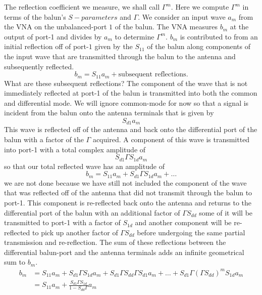 \documentclass[preprint]{aastex}
\begin{document}
The reflection coefficient we measure, we shall call $\Gamma^m$. Here we compute $\Gamma^m$ in terms of the balun's $S-parameters$ and $\Gamma$. We consider an input wave $a_m$ from the VNA on the unbalanced-port $1$ of the balun. The VNA measures $b_m$ at the output of port-1 and divides by $a_m$ to determine $\Gamma^m$. $b_m$ is contributed to from an initial reflection off of port-$1$ given by the $S_{11}$ of the balun along components of the input wave that are transmitted through the balun to the antenna and subsequently reflected.
\begin{equation}
b_m =  S_{11} a_m + \text{subsequent reflections}.
\end{equation}
What are these subsequent reflections? The component of the wave that is not immediately reflected at port-1 of the balun is transmitted into both the common and differential mode. We will ignore common-mode for now so that a signal is incident from the balun onto the antenna terminals that is given by 
\begin{equation}
 S_{d1} a_m
\end{equation}
 This wave is reflected off of the antenna and back onto the differential port of the balun with a factor of the $\Gamma$ acquired. A component of this  wave is transmitted into port-1 with a total complex amplitude of 
 \begin{equation}
 S_{d1} \Gamma S_{1d} a_m
 \end{equation}
 so that our total reflected wave has an amplitude of 
 \begin{equation}
 b_m = S_{11} a_m + S_{d1} \Gamma S_{1d} a_m + \dots 
 \end{equation}
 we are not done because we have still not included the component of the wave that was reflected off of the antenna that did not transmit through the balun to port-1. This component is re-reflected back onto the antenna and returns to the differential port of the balun with an additional factor of $ \Gamma S_{dd}$ some of it will be transmitted to port-1 with a factor of $S_{1d}$ and another component will be re-reflected to pick up another factor of $ \Gamma S_{dd}$ before undergoing the same partial transmission and re-reflection. The sum of these reflections between the differential balun-port and the antenna terminals adds an infinite geometrical sum to $b_m$.
 \begin{align}
 b_m &= S_{11} a_m + S_{d1} \Gamma S_{1d} a_m + S_{d1} \Gamma S_{dd} \Gamma S_{d1} a_m + \dots + S_{d1} \Gamma \left(\Gamma S_{dd}\right)^m S_{1d} a_m \nonumber \\
 &= S_{11} a_m + \frac{S_{d1} \Gamma S_{1d}}{1-S_{dd}\Gamma} a_m 
 \end{align} 
\end{document}
